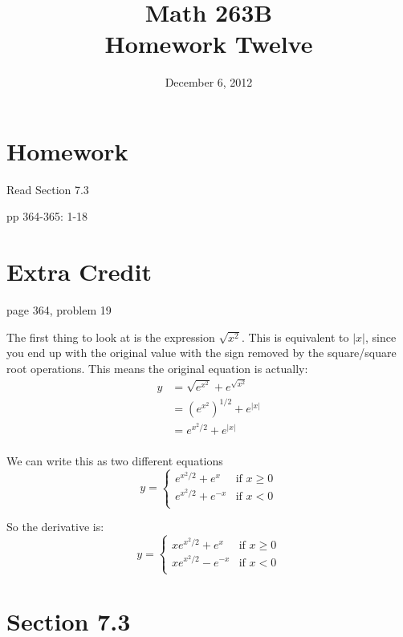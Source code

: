 \documentclass{exam}
\title{Math 263B \\ Homework Twelve}
\date{December 6, 2012}
\begin{document}
\maketitle

\section{Homework}

\begin{itemize*}
  \item Read Section 7.3
  \item pp 364-365: 1-18
\end{itemize*}


\section{Extra Credit}
page 364, problem 19
\ifprintanswers
\begin{solution}
The first thing to look at is the expression $\sqrt{x^2}$.  This is equivalent to $|x|$, since you end up with the
original value with the sign removed by the square/square root operations.  This means the original equation is
actually:
\begin{align*}
  y &= \sqrt{e^{x^2}} + e^{\sqrt{x^2}} \\
    &= \left( e^{x^2} \right)^{1/2} + e^{|x|} \\
    &= e^{x^2/2} + e^{|x|} \\
\end{align*}

We can write this as two different equations 
\[
  y = \begin{cases}
        e^{x^2/2} + e^{x}  & \text{if } x \geq 0 \\
        e^{x^2/2} + e^{-x} & \text{if } x < 0 \\
      \end{cases}
\]

So the derivative is:
\[
  y = \begin{cases}
        x e^{x^2/2} + e^{x}  & \text{if } x \geq 0 \\
        x e^{x^2/2} - e^{-x} & \text{if } x < 0 \\
      \end{cases}
\]
 
\end{solution}

\section{Section 7.3}
\end{document}
